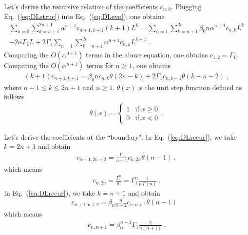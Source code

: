 \documentclass[a4paper,11pt]{article}
\begin{document}
Let's derive the recursive relation of the coefficients $c_{n,k}$. Plugging Eq.~(\ref{eq:DLstruc}) into Eq.~(\ref{eq:DLevo}), one obtains
\begin{align}
\sum _{n=0} \sum _{k=n+1}^{2 n+1} \alpha ^{n+1} c_{n+1,k+1} (k+1) L^k = \sum _{n=1} \sum_{k=n+1}^{2 n} \beta_0 n \alpha^{n+1} c_{n,k} L^k \nonumber\\ 
+2 \alpha  \Gamma_1 L + 2 \Gamma_1 \sum _{n=1} \sum_{k=n+1}^{2 n} \alpha^{n+1} c_{n,k} L^{k+1} \ . 
\end{align}
Comparing the $O(\alpha^{0+1})$ terms in the above equation, one obtains $c_{1,2} = \Gamma_1$. Comparing the $O(\alpha^{n+1})$ terms for $ n \geq 1$, one obtains
\begin{align}\label{eq:DLrecur}
(k+1) c_{n+1,k+1} = \beta_0 n c_{n,k} \theta(2n-k) + 2 \Gamma _1 c_{n,k-1} \theta (k-n-2) \ ,
\end{align}
where $ n+1 \leq k \leq 2n+1$ and $n \geq 1$. $\theta(x)$ is the unit step function defined as follows
\begin{align}
\theta(x) = \begin{cases}
        1 & \text{if } x \geq 0 \\
        0 & \text{if } x < 0
    \end{cases} \ .
\end{align}

Let's derive the coefficients at the ``boundary". In Eq.~(\ref{eq:DLrecur}), we take $k=2n+1$ and obtain
\begin{align}
c_{n+1,2n+2} = \frac{\Gamma_1}{n+1} c_{n,2n} \theta(n-1) \ ,
\end{align}
which means 
\begin{align}\label{eq:DLcn2n}
c_{n,2n} = \frac{\Gamma_1^n}{n!} = \Gamma_1^{n} \frac{1}{n \, \Gamma(n)} \ .
\end{align}
In Eq.~(\ref{eq:DLrecur}), we take $k=n+1$ and obtain
\begin{align}
c_{n+1,n+2} = \beta_0 \frac{n}{n+2} c_{n,n+1} \theta(n-1) \ ,
\end{align}
which means
\begin{align}\label{eq:DLcnnp1}
c_{n,n+1} =  \beta_0^{n-1} \Gamma_1 \frac{2}{n(n+1)} \ .
\end{align}
\end{document}
